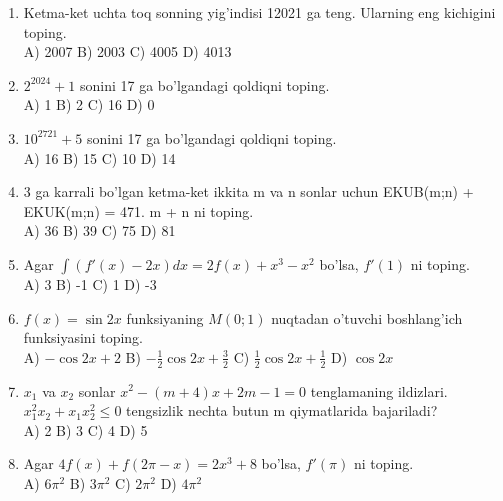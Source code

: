 \documentclass[12pt]{article}
\begin{document}
\begin{enumerate}
\item Ketma-ket uchta toq sonning yig'indisi 12021 ga teng. Ularning eng kichigini toping.
\\ A) 2007    
B) 2003    
C) 4005    
D) 4013
\vspace{4cm}

\item \( 2^{2024} + 1 \) sonini 17 ga bo'lgandagi qoldiqni toping.
\\ A) 1    
B) 2    
C) 16    
D) 0
\vspace{4cm}

\item \( 10^{2721} + 5 \) sonini 17 ga bo'lgandagi qoldiqni toping.
\\ A) 16    
B) 15    
C) 10    
D) 14
\vspace{4cm}

\item 3 ga karrali bo'lgan ketma-ket ikkita m va n sonlar uchun EKUB(m;n) + EKUK(m;n) = 471. m + n ni toping.
\\ A) 36    
B) 39    
C) 75    
D) 81
\vspace{4cm}

\item Agar \( \int (f'(x) - 2x) dx = 2f(x) + x^3 - x^2 \) bo'lsa, \( f'(1) \) ni toping.
\\ A) 3    
B) -1    
C) 1    
D) -3
\vspace{4cm}

\item \( f(x) = \sin 2x \) funksiyaning \( M(0;1) \) nuqtadan o'tuvchi boshlang'ich funksiyasini toping.
\\ A) \( -\cos 2x + 2 \)    
B) \( -\frac{1}{2} \cos 2x + \frac{3}{2} \)    
C) \( \frac{1}{2} \cos 2x + \frac{1}{2} \)    
D) \( \cos 2x \)
\vspace{4cm}

\item \( x_1 \) va \( x_2 \) sonlar \( x^2 - (m + 4)x + 2m - 1 = 0 \) tenglamaning ildizlari. \( x_1^2 x_2 + x_1 x_2^2 \leq 0 \) tengsizlik nechta butun m qiymatlarida bajariladi?
\\ A) 2    
B) 3    
C) 4    
D) 5
\vspace{4cm}

\item Agar \( 4f(x) + f(2\pi - x) = 2x^3 + 8 \) bo'lsa, \( f'(\pi) \) ni toping.
\\ A) \( 6\pi^2 \)    
B) \( 3\pi^2 \)    
C) \( 2\pi^2 \)    
D) \( 4\pi^2 \)
\vspace{4cm}


\end{enumerate}
\end{document}
